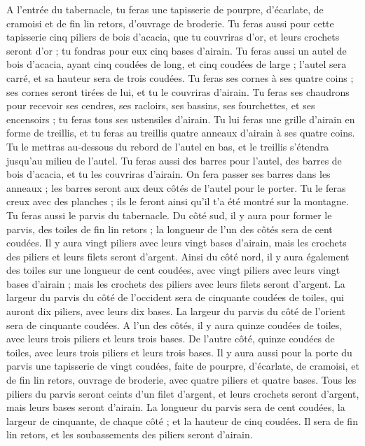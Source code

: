 \begin{multicols}{2}
A l'entrée du tabernacle, tu feras une tapisserie de pourpre, d'écarlate, de cramoisi et de fin lin retors, d'ouvrage de broderie.
Tu feras aussi pour cette tapisserie cinq piliers de bois d’acacia, que tu couvriras d'or, et leurs crochets seront d'or ; tu fondras pour eux cinq bases d'airain.
\VerseOne{}Tu feras aussi un autel de bois d’acacia, ayant cinq coudées de long, et cinq coudées de large ; l'autel sera carré, et sa hauteur sera de trois coudées.
Tu feras ses cornes à ses quatre coins ; ses cornes seront tirées de lui, et tu le couvriras d'airain\FTNT{}.
Tu feras ses chaudrons pour recevoir ses cendres, ses racloirs, ses bassins, ses fourchettes, et ses encensoirs ; tu feras tous ses ustensiles d'airain.
Tu lui feras une grille d'airain en forme de treillis, et tu feras au treillis quatre anneaux d'airain à ses quatre coins.
Tu le mettras au-dessous du rebord de l'autel en bas, et le treillis s'étendra jusqu'au milieu de l'autel.
Tu feras aussi des barres pour l'autel, des barres de bois d’acacia, et tu les couvriras d'airain.
On fera passer ses barres dans les anneaux ; les barres seront aux deux côtés de l'autel pour le porter.
Tu le feras creux avec des planches ; ils le feront ainsi qu'il t'a été montré sur la montagne\FTNT{}.
Tu feras aussi le parvis du tabernacle. Du côté sud, il y aura pour former le parvis, des toiles de fin lin retors ; la longueur de l'un des côtés sera de cent coudées.
Il y aura vingt piliers avec leurs vingt bases d'airain, mais les crochets des piliers et leurs filets seront d'argent.
Ainsi du côté nord, il y aura également des toiles sur une longueur de cent coudées, avec vingt piliers avec leurs vingt bases d'airain ; mais les crochets des piliers avec leurs filets seront d'argent.
La largeur du parvis du côté de l'occident sera de cinquante coudées de toiles, qui auront dix piliers, avec leurs dix bases.
La largeur du parvis du côté de l'orient sera de cinquante coudées.
A l'un des côtés, il y aura quinze coudées de toiles, avec leurs trois piliers et leurs trois bases.
De l'autre côté, quinze coudées de toiles, avec leurs trois piliers et leurs trois bases.
Il y aura aussi pour la porte du parvis une tapisserie de vingt coudées, faite de pourpre, d'écarlate, de cramoisi, et de fin lin retors, ouvrage de broderie, avec quatre piliers et quatre bases.
Tous les piliers du parvis seront ceints d'un filet d'argent, et leurs crochets seront d'argent, mais leurs bases seront d'airain.
La longueur du parvis sera de cent coudées, la largeur de cinquante, de chaque côté ; et la hauteur de cinq coudées. Il sera de fin lin retors, et les soubassements des piliers seront d'airain.

\end{multicols}
